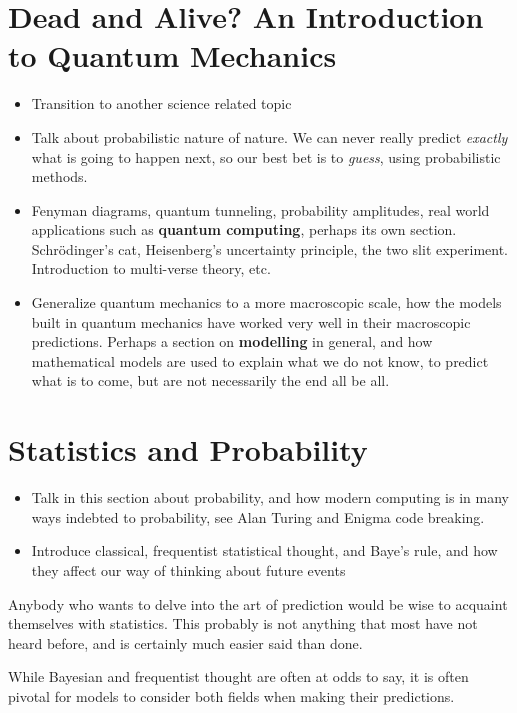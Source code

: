 \documentclass[12pt,twoside]{book}
\newcommand{\imp}[1]{\textbf{#1}}
\begin{document}
	\chapter[Quantum Mechanics]{Dead and Alive? An Introduction to Quantum Mechanics}
	\begin{itemize}
		\item Transition to another science related topic
		\item Talk about probabilistic nature of nature.  We can never really predict \emph{exactly} what is going to happen next, so our best bet is to \emph{guess}, using probabilistic methods.  
		\item Fenyman diagrams, quantum tunneling, probability amplitudes, real world applications such as \imp{quantum computing}, perhaps its own section.  Schr{\"o}dinger's cat, Heisenberg's uncertainty principle, the two slit experiment.  Introduction to multi-verse theory, etc.
		\item Generalize quantum mechanics to a more macroscopic scale, how the models built in quantum mechanics have worked very well in their macroscopic predictions.  Perhaps a section on \imp{modelling} in general, and how mathematical models are used to explain what we do not know, to predict what is to come, but are not necessarily the end all be all.  
	\end{itemize}
	\chapter{Statistics and Probability}
	\begin{itemize}
		\item Talk in this section about probability, and how modern computing is in many ways indebted to probability, see Alan Turing and Enigma code breaking.  
		\item Introduce classical, frequentist statistical thought, and Baye's rule, and how they affect our way of thinking about future events
	\end{itemize}
	Anybody who wants to delve into the art of prediction would be wise to acquaint themselves with statistics.  This probably is not anything that most have not heard before, and is certainly much easier said than done.  
	
	While Bayesian and frequentist thought are often at odds to say, it is often pivotal for models to consider both fields when making their predictions.
\end{document}
